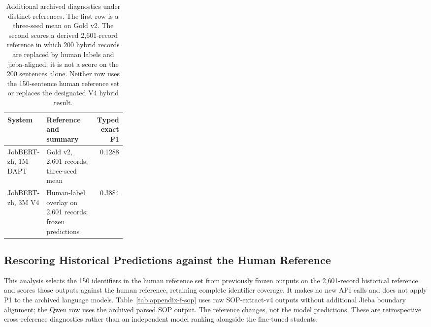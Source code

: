 \begin{table}[htbp]
\caption{Additional archived diagnostics under distinct references. The first row is a three-seed mean on Gold v2. The second scores a derived 2,601-record reference in which 200 hybrid records are replaced by human labels and jieba-aligned; it is not a score on the 200 sentences alone. Neither row uses the 150-sentence human reference set or replaces the designated V4 hybrid result.}
\label{tab:archived-reference-checks-r38}
\centering\small
\begin{tabularx}{\linewidth}{@{}P{0.28\linewidth}Lr@{}}
\toprule
System & Reference and summary & Typed exact F1 \\
\midrule
JobBERT-zh, 1M DAPT & Gold v2, 2,601 records; three-seed mean & 0.1288 \\
JobBERT-zh, 3M V4 & Human-label overlay on 2,601 records; frozen predictions & 0.3884 \\
\bottomrule
\end{tabularx}
\end{table}


\FloatBarrier

\subsection{Rescoring Historical Predictions against the Human Reference}
\label{sec:sop-gold-rescore}

This analysis selects the 150 identifiers in the human reference set from previously frozen outputs on the 2,601-record historical reference and scores those outputs against the human reference, retaining complete identifier coverage. It makes no new API calls and does not apply P1 to the archived language models. Table~\ref{tab:appendix-f-sop} uses raw SOP-extract-v4 outputs without additional Jieba boundary alignment; the Qwen row uses the archived parsed SOP output. The reference changes, not the model predictions. These are retrospective cross-reference diagnostics rather than an independent model ranking alongside the fine-tuned students.

